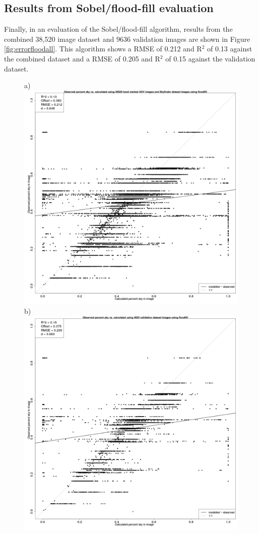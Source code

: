 \documentclass[final,3p,times,authoryear]{elsarticle}
\begin{document}
\subsection{Results from Sobel/flood-fill evaluation}\label{sec:resultsflood}
Finally, in an evaluation of the Sobel/flood-fill algorithm, results from the combined 38,520 image dataset and 9636 validation images are shown in Figure \ref{fig:errorfloodall}. This algorithm shows a RMSE of 0.212 and R$^{2}$ of 0.13 against the combined dataset and a RMSE of 0.205 and R$^{2}$ of 0.15 against the validation dataset.


\begin{figure}
\centering
a)\includegraphics[scale=0.12]{Images/ErrorPlots2FloodfillAll.png}
b)\includegraphics[scale=0.12]{Images/ErrorPlots2FloodfillValidation.png}

\end{figure}
\end{document}
